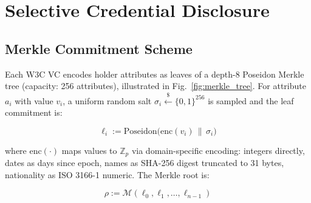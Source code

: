 \documentclass[journal,twoside,10pt]{IEEEtran}
\begin{document}
\section{Selective Credential Disclosure}
\label{sec:disclosure}

\subsection{Merkle Commitment Scheme}

Each W3C VC encodes holder attributes as leaves of a depth-8 Poseidon Merkle
tree (capacity: 256 attributes), illustrated in Fig.~\ref{fig:merkle_tree}.
For attribute $a_i$ with value $v_i$, a uniform random salt
$\sigma_i \xleftarrow{\$} \{0,1\}^{256}$ is sampled and the leaf commitment
is:

\begin{equation}
  \ell_i := \mathrm{Poseidon}\bigl(\mathrm{enc}(v_i) \,\|\, \sigma_i\bigr)
  \label{eq:leaf}
\end{equation}

\noindent where $\mathrm{enc}(\cdot)$ maps values to $\mathbb{Z}_p$ via
domain-specific encoding: integers directly, dates as days since epoch,
names as SHA-256 digest truncated to 31 bytes, nationality as ISO 3166-1
numeric. The Merkle root is:

\begin{equation}
  \rho := \mathcal{M}(\ell_0, \ell_1, \ldots, \ell_{n-1})
  \label{eq:root}
\end{equation}
\end{document}
